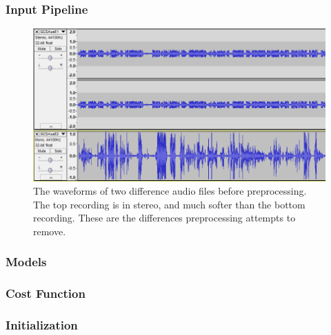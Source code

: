 \documentclass[a4paper,11pt,notitlepage]{article}
\begin{document}
\subsubsection{Input Pipeline}\label{section:input_pipeline}


\begin{figure}[H]
	\centering
	\vspace{0.5cm}
	\includegraphics[scale = 0.5]{figs/origional_waveforms.png}
	\caption{The waveforms of two difference audio files before preprocessing. The top recording is in stereo, and much softer than the bottom recording. These are the differences preprocessing attempts to remove.}
	\label{before_preprocessing}
\end{figure}

\subsubsection{Models}



\subsubsection{Cost Function}


\subsubsection{Initialization}
\end{document}

